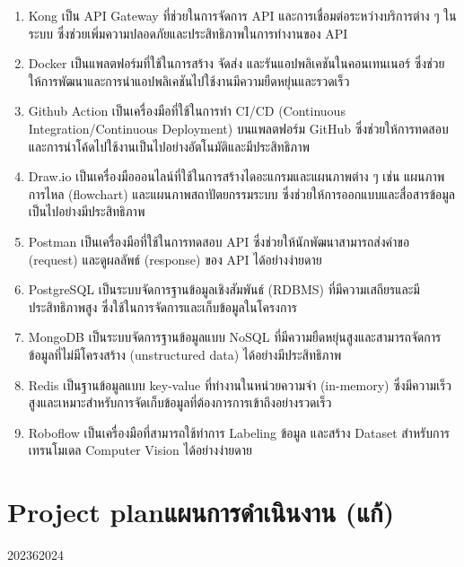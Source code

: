 \begin{enumerate}
    \item Kong เป็น API Gateway ที่ช่วยในการจัดการ API และการเชื่อมต่อระหว่างบริการต่าง ๆ ในระบบ ซึ่งช่วยเพิ่มความปลอดภัยและประสิทธิภาพในการทำงานของ API

    \item Docker เป็นแพลตฟอร์มที่ใช้ในการสร้าง จัดส่ง และรันแอปพลิเคชันในคอนเทนเนอร์ ซึ่งช่วยให้การพัฒนาและการนำแอปพลิเคชันไปใช้งานมีความยืดหยุ่นและรวดเร็ว

    \item Github Action เป็นเครื่องมือที่ใช้ในการทำ CI/CD (Continuous Integration/Continuous Deployment) บนแพลตฟอร์ม GitHub ซึ่งช่วยให้การทดสอบและการนำโค้ดไปใช้งานเป็นไปอย่างอัตโนมัติและมีประสิทธิภาพ

    \item Draw.io เป็นเครื่องมือออนไลน์ที่ใช้ในการสร้างไดอะแกรมและแผนภาพต่าง ๆ เช่น แผนภาพการไหล (flowchart) และแผนภาพสถาปัตยกรรมระบบ ซึ่งช่วยให้การออกแบบและสื่อสารข้อมูลเป็นไปอย่างมีประสิทธิภาพ

    \item Postman เป็นเครื่องมือที่ใช้ในการทดสอบ API ซึ่งช่วยให้นักพัฒนาสามารถส่งคำขอ (request) และดูผลลัพธ์ (response) ของ API ได้อย่างง่ายดาย

    \item PostgreSQL เป็นระบบจัดการฐานข้อมูลเชิงสัมพันธ์ (RDBMS) ที่มีความเสถียรและมีประสิทธิภาพสูง ซึ่งใช้ในการจัดการและเก็บข้อมูลในโครงการ

    \item MongoDB เป็นระบบจัดการฐานข้อมูลแบบ NoSQL ที่มีความยืดหยุ่นสูงและสามารถจัดการข้อมูลที่ไม่มีโครงสร้าง (unstructured data) ได้อย่างมีประสิทธิภาพ

    \item Redis เป็นฐานข้อมูลแบบ key-value ที่ทำงานในหน่วยความจำ (in-memory) ซึ่งมีความเร็วสูงและเหมาะสำหรับการจัดเก็บข้อมูลที่ต้องการการเข้าถึงอย่างรวดเร็ว

    \item Roboflow เป็นเครื่องมือที่สามารถใช้ทำการ Labeling ข้อมูล และสร้าง Dataset สำหรับการเทรนโมเดล Computer Vision ได้อย่างง่ายดาย
\end{enumerate}

\section{\ifenglish Project plan\else แผนการดำเนินงาน (แก้)\fi}

\begin{plan}{10}{2023}{6}{2024}
\end{plan}

